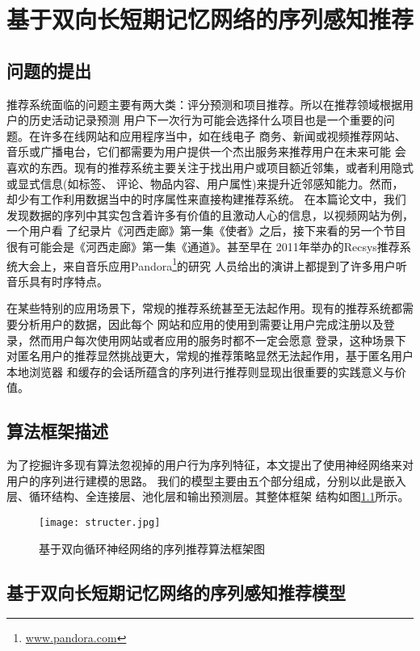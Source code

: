 ﻿%
\chapter{基于双向长短期记忆网络的序列感知推荐}

\section{问题的提出}
推荐系统面临的问题主要有两大类：评分预测和项目推荐。所以在推荐领域根据用户的历史活动记录预测%
用户下一次行为可能会选择什么项目也是一个重要的问题。在许多在线网站和应用程序当中，如在线电子%
商务、新闻或视频推荐网站、音乐或广播电台，它们都需要为用户提供一个杰出服务来推荐用户在未来可能%
会喜欢的东西。现有的推荐系统主要关注于找出用户或项目额近邻集，或者利用隐式或显式信息(如标签、%
评论、物品内容、用户属性)来提升近邻感知能力。然而，却少有工作利用数据当中的时序属性来直接构建推荐系统。%
在本篇论文中，我们发现数据的序列中其实包含着许多有价值的且激动人心的信息，以视频网站为例，一个用户看%
了纪录片《河西走廊》第一集《使者》之后，接下来看的另一个节目很有可能会是《河西走廊》第一集《通道》。甚至早在%
2011年举办的Recsys推荐系统大会上，来自音乐应用Pandora\footnote{\url{www.pandora.com}}的研究%
人员给出的演讲上都提到了许多用户听音乐具有时序特点。%

在某些特别的应用场景下，常规的推荐系统甚至无法起作用。现有的推荐系统都需要分析用户的数据，因此每个%
网站和应用的使用到需要让用户完成注册以及登录，然而用户每次使用网站或者应用的服务时都不一定会愿意%
登录，这种场景下对匿名用户的推荐显然挑战更大，常规的推荐策略显然无法起作用，基于匿名用户本地浏览器%
和缓存的会话所蕴含的序列进行推荐则显现出很重要的实践意义与价值。

\section{算法框架描述}

为了挖掘许多现有算法忽视掉的用户行为序列特征，本文提出了使用神经网络来对用户的序列进行建模的思路。%
我们的模型主要由五个部分组成，分别以此是嵌入层、循环结构、全连接层、池化层和输出预测层。其整体框架%
结构如图\ref{fig:structer}所示。

\begin{figure}[htb]
  \centering
  \texttt{[image: structer.jpg]}\\
  \caption{基于双向循环神经网络的序列推荐算法框架图}
  \label{fig:structer}
\end{figure}
%


\section{基于双向长短期记忆网络的序列感知推荐模型}
